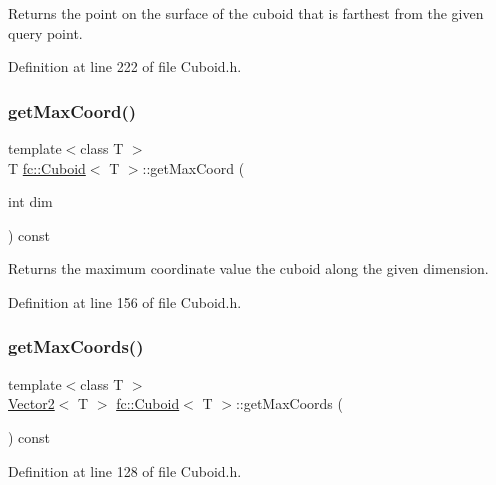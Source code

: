 Returns the point on the surface of the cuboid that is farthest from the given query point. 

Definition at line 222 of file Cuboid.\+h.

\mbox{\label{classfc_1_1Cuboid_aff744fb76a635c4d15de8af208bade19}} 
\subsubsection{\texorpdfstring{get\+Max\+Coord()}{getMaxCoord()}}
{\footnotesize\ttfamily template$<$class T $>$ \\
T \hyperlink{classfc_1_1Cuboid}{fc\+::\+Cuboid}$<$ T $>$\+::get\+Max\+Coord (\begin{DoxyParamCaption}\item[{int}]{dim }\end{DoxyParamCaption}) const}

Returns the maximum coordinate value the cuboid along the given dimension. 

Definition at line 156 of file Cuboid.\+h.

\mbox{\label{classfc_1_1Cuboid_a27defdb3f39fd0b753190f84b44a0d28}} 
\subsubsection{\texorpdfstring{get\+Max\+Coords()}{getMaxCoords()}}
{\footnotesize\ttfamily template$<$class T $>$ \\
\hyperlink{classfc_1_1Vector2}{Vector2}$<$ T $>$ \hyperlink{classfc_1_1Cuboid}{fc\+::\+Cuboid}$<$ T $>$\+::get\+Max\+Coords (\begin{DoxyParamCaption}{ }\end{DoxyParamCaption}) const}



Definition at line 128 of file Cuboid.\+h.

\mbox{\label{classfc_1_1Cuboid_a4e5fa796537b42d2e1696fec49739917}} 
